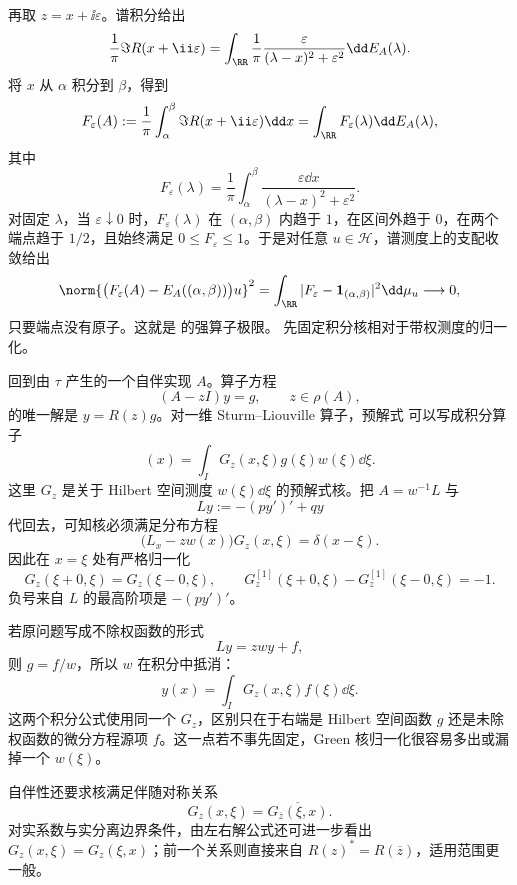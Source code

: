 再取 $z=x+\ii\varepsilon$。谱积分给出
\[
 \frac{1}{\pi}\Im R(x+\ii\varepsilon)
 =\int_{\RR}
 \frac{1}{\pi}\frac{\varepsilon}{(\lambda-x)^2+\varepsilon^2}
 \dd E_A(\lambda).
\]
将 $x$ 从 $\alpha$ 积分到 $\beta$，得到
\[
 F_\varepsilon(A)
 :=\frac{1}{\pi}\int_\alpha^\beta\Im R(x+\ii\varepsilon)\dd x
 =\int_{\RR}F_\varepsilon(\lambda)\dd E_A(\lambda),
\]
其中
\[
 F_\varepsilon(\lambda)
 =\frac{1}{\pi}\int_\alpha^\beta
 \frac{\varepsilon\dd x}{(\lambda-x)^2+\varepsilon^2}.
\]
对固定 $\lambda$，当 $\varepsilon\downarrow0$ 时，$F_\varepsilon(\lambda)$ 在 $(\alpha,\beta)$ 内趋于 $1$，在区间外趋于 $0$，在两个端点趋于 $1/2$，且始终满足 $0\le F_\varepsilon\le1$。于是对任意 $u\in\mathcal H$，谱测度上的支配收敛给出
\[
 \norm{\bigl(F_\varepsilon(A)-E_A((\alpha,\beta))\bigr)u}^2
 =\int_{\RR}|F_\varepsilon-\mathbf1_{(\alpha,\beta)}|^2\dd\mu_u
 \longrightarrow0,
\]
只要端点没有原子。这就是 的强算子极限。
先固定积分核相对于带权测度的归一化。

回到由 $\tau$ 产生的一个自伴实现 $A$。算子方程
\begin{equation*}(A-zI)y=g,
 \qquad z\in\rho(A),
\end{equation*}
的唯一解是 $y=R(z)g$。对一维 Sturm--Liouville 算子，预解式 可以写成积分算子
\begin{equation*}[R(z)g](x)
 =\int_I G_z(x,\xi)g(\xi)w(\xi)\dd\xi.
\end{equation*}
这里 $G_z$ 是关于 Hilbert 空间测度 $w(\xi)\dd\xi$ 的预解式核。把 $A=w^{-1}L$ 与
\[
 Ly:=-(py')'+qy
\]
代回去，可知核必须满足分布方程
\[
 \bigl(L_x-z w(x)\bigr)G_z(x,\xi)=\delta(x-\xi).
\]
因此在 $x=\xi$ 处有严格归一化
\[
 G_z(\xi+0,\xi)=G_z(\xi-0,\xi),
 \qquad
 G_z^{[1]}(\xi+0,\xi)-G_z^{[1]}(\xi-0,\xi)=-1.
\]
负号来自 $L$ 的最高阶项是 $-(py')'$。

若原问题写成不除权函数的形式
\begin{equation*}Ly=zwy+f,
\end{equation*}
则 $g=f/w$，所以 $w$ 在积分中抵消：
\begin{equation*}y(x)=\int_I G_z(x,\xi)f(\xi)\dd\xi.
\end{equation*}
这两个积分公式使用同一个 $G_z$，区别只在于右端是 Hilbert 空间函数 $g$ 还是未除权函数的微分方程源项 $f$。这一点若不事先固定，Green 核归一化很容易多出或漏掉一个 $w(\xi)$。

自伴性还要求核满足伴随对称关系
\[
 G_z(x,\xi)=\overline{G_{\overline z}(\xi,x)}.
\]
对实系数与实分离边界条件，由左右解公式还可进一步看出 $G_z(x,\xi)=G_z(\xi,x)$；前一个关系则直接来自 $R(z)^*=R(\overline z)$，适用范围更一般。

